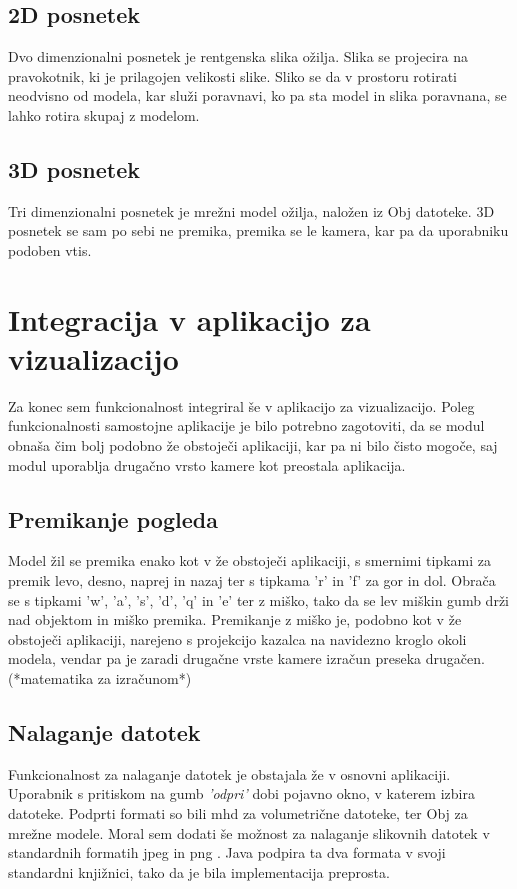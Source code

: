\documentclass[a4paper, 12pt]{book}
\begin{document}
\subsection*{2D posnetek}

Dvo dimenzionalni posnetek je rentgenska slika ožilja. Slika se projecira na pravokotnik, ki je prilagojen velikosti slike. Sliko se da v prostoru rotirati neodvisno od modela, kar služi poravnavi, ko pa sta model in slika poravnana, se lahko rotira skupaj z modelom.

\subsection*{3D posnetek}

Tri dimenzionalni posnetek je mrežni model ožilja, naložen iz Obj datoteke. 3D posnetek se sam po sebi ne premika, premika se le kamera, kar pa da uporabniku podoben vtis.

\section{Integracija v aplikacijo za vizualizacijo}

Za konec sem funkcionalnost integriral še v aplikacijo za vizualizacijo. Poleg funkcionalnosti samostojne aplikacije je bilo potrebno zagotoviti, da se modul obnaša čim bolj podobno že obstoječi aplikaciji, kar pa ni bilo čisto mogoče, saj modul uporablja drugačno vrsto kamere kot preostala aplikacija. 

\subsection*{Premikanje pogleda}

Model žil se premika enako kot v že obstoječi aplikaciji, s smernimi tipkami za premik levo, desno, naprej in nazaj ter s tipkama 'r' in 'f' za gor in dol. Obrača se s tipkami 'w', 'a', 's', 'd', 'q' in 'e' ter z miško, tako da se lev miškin gumb drži nad objektom in miško premika. Premikanje z miško je, podobno kot v že obstoječi aplikaciji, narejeno s projekcijo kazalca na navidezno kroglo okoli modela, vendar pa je zaradi drugačne vrste kamere izračun preseka drugačen. (*matematika za izračunom*) 


\subsection*{Nalaganje datotek}
Funkcionalnost za nalaganje datotek je obstajala že v osnovni aplikaciji. Uporabnik s pritiskom na gumb \emph{'odpri'} dobi pojavno okno, v katerem izbira datoteke. Podprti formati so bili mhd za volumetrične datoteke, ter Obj za mrežne modele. Moral sem dodati še možnost za nalaganje slikovnih datotek v standardnih formatih jpeg in png \cite{png}. Java podpira ta dva formata v svoji standardni knjižnici, tako da je bila implementacija preprosta.
\end{document}
